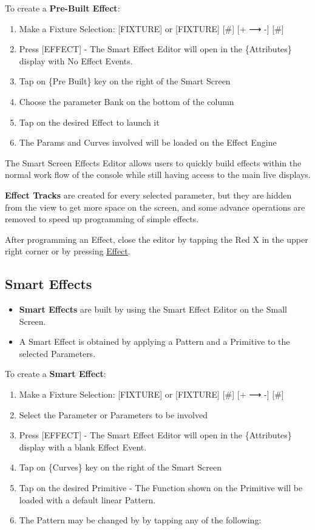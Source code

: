 \documentclass[
]{article}
\begin{document}
To create a \textbf{Pre-Built Effect}:

\begin{enumerate}
\def\labelenumi{\arabic{enumi}.}
\item
  Make a Fixture Selection: {[}FIXTURE{]} or {[}FIXTURE{]} {[}\#{]} {[}+ ⟶ -{]} {[}\#{]}
\item
  Press {[}EFFECT{]} - The Smart Effect Editor will open in the \{Attributes\} display with No Effect Events.
\item
  Tap on \{Pre Built\} key on the right of the Smart Screen
\item
  Choose the parameter Bank on the bottom of the column
\item
  Tap on the desired Effect to launch it
\item
  The Params and Curves involved will be loaded on the Effect Engine
\end{enumerate}

The Smart Screen Effects Editor allows users to quickly build effects within the normal work flow of the console while still having access to the main live displays.

\textbf{Effect Tracks} are created for every selected parameter, but they are hidden from the view to get more space on the screen, and some advance operations are removed to speed up programming of simple effects.

After programming an Effect, close the editor by tapping the Red X in the upper right corner or by pressing \protect\hyperlink{effect}{Effect}.

\hypertarget{Smart-Effects-9.4}{%
\subsection{Smart Effects}\label{Smart-Effects-9.4}}

\begin{itemize}
\item
  \textbf{Smart Effects} are built by using the Smart Effect Editor on the Small Screen.
\item
  A Smart Effect is obtained by applying a Pattern and a Primitive to the selected Parameters.
\end{itemize}

To create a \textbf{Smart Effect}:

\begin{enumerate}
\def\labelenumi{\arabic{enumi}.}
\item
  Make a Fixture Selection: {[}FIXTURE{]} or {[}FIXTURE{]} {[}\#{]} {[}+ ⟶ -{]} {[}\#{]}
\item
  Select the Parameter or Parameters to be involved
\item
  Press {[}EFFECT{]} - The Smart Effect Editor will open in the \{Attributes\} display with a blank Effect Event.
\item
  Tap on \{Curves\} key on the right of the Smart Screen
\item
  Tap on the desired Primitive - The Function shown on the Primitive will be loaded with a default linear Pattern.
\item
  The Pattern may be changed by by tapping any of the following:
\end{enumerate}
\end{document}
